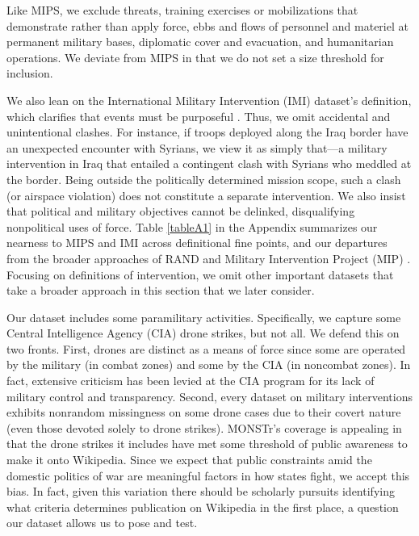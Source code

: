 \documentclass[fleqn,12pt]{article}
\begin{document}
\noindent \doublespacing
Like MIPS, we exclude threats, training exercises or mobilizations that demonstrate rather than apply force, ebbs and flows of personnel and materiel at permanent military bases, diplomatic cover and evacuation, and humanitarian operations. We deviate from MIPS in that we do not set a size threshold for inclusion.

We also lean on the International Military Intervention (IMI) dataset’s definition, which clarifies that events must be purposeful \citep{PearsonBaumann93, KisanganiPickering08}. Thus, we omit accidental and unintentional clashes. For instance, if troops deployed along the Iraq border have an unexpected encounter with Syrians, we view it as simply that—a military intervention in Iraq that entailed a contingent clash with Syrians who meddled at the border. Being outside the politically determined mission scope, such a clash (or airspace violation) does not constitute a separate intervention. We also insist that political and military objectives cannot be delinked, disqualifying nonpolitical uses of force. Table \ref{tableA1} in the Appendix summarizes our nearness to MIPS and IMI across definitional fine points, and our departures from the broader approaches of RAND \citep{Kavanagh19} and Military Intervention Project (MIP) \citep{KushiDT22}. Focusing on definitions of intervention, we omit other important datasets that take a broader approach in this section that we later consider.

Our dataset includes some paramilitary activities. Specifically, we capture some Central Intelligence Agency (CIA) drone strikes, but not all. We defend this on two fronts. First, drones are distinct as a means of force since some are operated by the military (in combat zones) and some by the CIA (in noncombat zones). In fact, extensive criticism has been levied at the CIA program for its lack of military control and transparency. Second, every dataset on military interventions exhibits nonrandom missingness on some drone cases due to their covert nature (even those devoted solely to drone strikes). MONSTr’s coverage is appealing in that the drone strikes it includes have met some threshold of public awareness to make it onto Wikipedia. Since we expect that public constraints amid the domestic politics of war are meaningful factors in how states fight, we accept this bias. In fact, given this variation there should be scholarly pursuits identifying what criteria determines publication on Wikipedia in the first place, a question our dataset allows us to pose and test.
\end{document}
